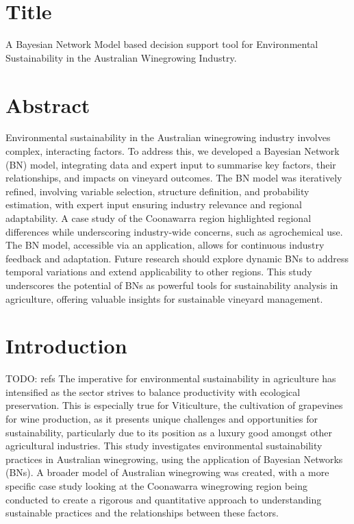 \section{Title}
A Bayesian Network Model based decision support tool for Environmental Sustainability in the Australian Winegrowing Industry.

\section{Abstract}

Environmental sustainability in the Australian winegrowing industry involves complex, interacting factors. To address this, we developed a Bayesian Network (BN) model, integrating data and expert input to summarise key factors, their relationships, and impacts on vineyard outcomes. The BN model was iteratively refined, involving variable selection, structure definition, and probability estimation, with expert input ensuring industry relevance and regional adaptability. A case study of the Coonawarra region highlighted regional differences while underscoring industry-wide concerns, such as agrochemical use. The BN model, accessible via an application, allows for continuous industry feedback and adaptation. Future research should explore dynamic BNs to address temporal variations and extend applicability to other regions. This study underscores the potential of BNs as powerful tools for sustainability analysis in agriculture, offering valuable insights for sustainable vineyard management.

\section{Introduction}
TODO: refs
The imperative for environmental sustainability in agriculture has intensified as the sector strives to balance productivity with ecological preservation. This is especially true for Viticulture, the cultivation of grapevines for wine production, as it presents unique challenges and opportunities for sustainability, particularly due to its position as a luxury good amongst other agricultural industries. This study investigates environmental sustainability practices in Australian winegrowing, using the application of Bayesian Networks (BNs). A broader model of Australian winegrowing was created, with a more specific case study looking at the Coonawarra winegrowing region being conducted to create a rigorous and quantitative approach to understanding sustainable practices and the relationships between these factors.

